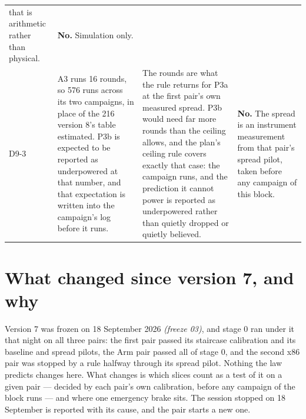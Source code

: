 \documentclass[11pt]{article}
\newcommand{\gl}[1]{{\color{soft}\itshape\small (#1)}}
\begin{document}
{\begin{longtable}{@{}p{1.0cm} >{\raggedright\arraybackslash}p{6.2cm} >{\raggedright\arraybackslash}p{6.0cm} >{\raggedright\arraybackslash}p{2.2cm}@{}}
that is arithmetic rather than physical. & \textbf{No.} Simulation only. \\
D9-3 & A3 runs 16 rounds, so 576 runs across its two campaigns, in place of the 216
version 8's table estimated. P3b is expected to be reported as underpowered at that number, and
that expectation is written into the campaign's log before it runs. & The rounds are what the
rule returns for P3a at the first pair's own measured spread. P3b would need far more rounds than
the ceiling allows, and the plan's ceiling rule covers exactly that case: the campaign runs, and
the prediction it cannot power is reported as underpowered rather than quietly dropped or quietly
believed. & \textbf{No.} The spread is an instrument measurement from that pair's spread pilot,
taken before any campaign of this block. \\
\bottomrule
\end{longtable}}

\section*{What changed since version 7, and why}
Version 7 was frozen on 18 September 2026 \gl{freeze 03}, and stage 0 ran under it that night on all three pairs: the first pair passed its staircase calibration and its baseline and spread pilots, the Arm pair passed all of stage 0, and the second x86 pair was stopped by a rule halfway through its spread pilot. Nothing the law predicts changes here. What changes is which slices count as a test of it on a given pair --- decided by each pair's own calibration, before any campaign of the block runs --- and where one emergency brake sits. The session stopped on 18 September is reported with its cause, and the pair starts a new one.
\end{document}

